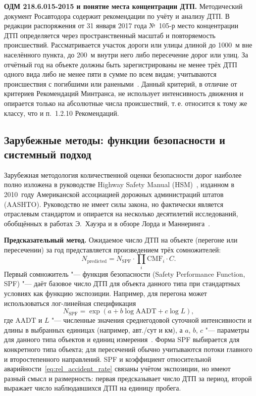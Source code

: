 \documentclass[coursework]{SCWorks}
\begin{document}
\textbf{ОДМ 218.6.015-2015 и понятие места концентрации ДТП.}
Методический документ Росавтодора содержит рекомендации по учёту и
анализу ДТП. В редакции распоряжения от 31 января 2017 года №~105-р
место концентрации ДТП определяется через пространственный масштаб
и повторяемость происшествий. Рассматривается участок дороги или
улицы длиной до 1000~м вне населённого пункта, до 200~м внутри него
либо пересечение дорог или улиц. За отчётный год на объекте должны
быть зарегистрированы не менее трёх ДТП одного вида либо не менее
пяти в сумме по всем видам; учитываются происшествия с погибшими
или ранеными~\cite{odm2015}. Данный критерий, в отличие от критериев
Рекомендаций Минтранса, не использует интенсивность движения и
опирается только на абсолютные числа происшествий, т.\,е. относится к
тому же классу, что и п.~1.2.10 Рекомендаций.

\subsection{Зарубежные методы: функции безопасности и системный подход}

Зарубежная методология количественной оценки безопасности дорог
наиболее полно изложена в руководстве \foreignlanguage{english}{Highway Safety Manual} (HSM)~\cite{hsm2010}, изданном в 2010~году Американской ассоциацией дорожных администраций штатов (AASHTO). Руководство не имеет силы закона,
но фактически является отраслевым стандартом и опирается на несколько
десятилетий исследований, обобщённых в работах Э.~Хауэра \cite{hauer1997}
и в обзоре Лорда и Маннеринга~\cite{lord2010}.

\textbf{Предсказательный метод.} Ожидаемое число ДТП на объекте
(перегоне или пересечении) за год представляется произведением трёх
сомножителей:
\begin{equation}
  N_{\text{predicted}} = N_{\text{SPF}} \cdot
  \prod_{i} \mathrm{CMF}_i \cdot C.
  \label{eq:hsm}
\end{equation}
Первый сомножитель "--- функция безопасности (Safety Performance
Function, SPF) "--- даёт базовое число ДТП для объекта данного типа при
стандартных условиях как функцию экспозиции. Например, для перегона
может использоваться лог-линейная спецификация
\begin{equation}
  N_{\text{SPF}} = \exp\!\left(a + b\log\mathrm{AADT} + c\log L\right),
  \label{eq:spf}
\end{equation}
где $\mathrm{AADT}$ и $L$ "--- численные значения среднегодовой
суточной интенсивности и длины в выбранных единицах (например,
авт./сут и км), а $a$, $b$, $c$ "--- параметры для данного типа
объектов и единиц измерения~\cite{lord2010,hsm2010}. Форма SPF
выбирается для конкретного типа объекта; для пересечений обычно
учитываются потоки главного и второстепенного направлений.
SPF и коэффициент относительной аварийности~\eqref{eq:rel_accident_rate}
связаны учётом экспозиции, но имеют разный смысл и размерность:
первая предсказывает число ДТП за период, второй выражает число
наблюдавшихся ДТП на единицу пробега.
\end{document}
